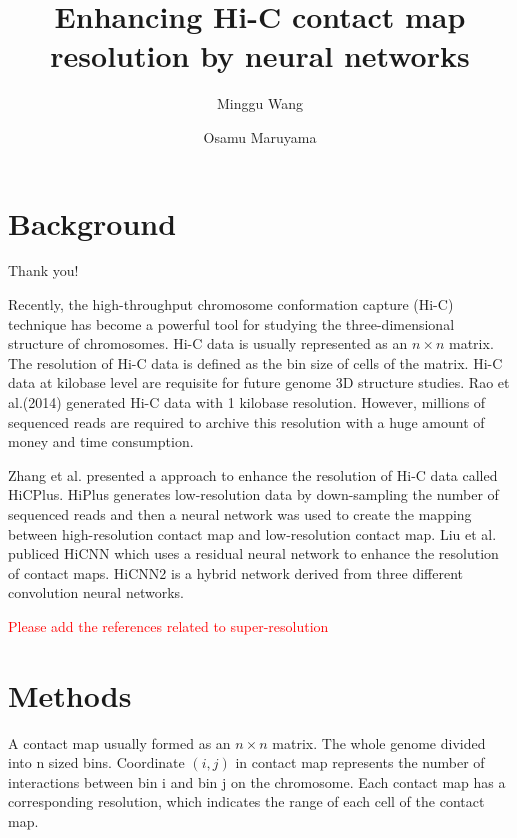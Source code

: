 \documentclass[a4paper,12pt]{article}
\begin{document}
\title{Enhancing Hi-C contact map resolution by neural networks}
\author{Minggu Wang \and Osamu Maruyama}
\maketitle

\section{Background}

Thank you!

Recently, the high-throughput chromosome conformation capture (Hi-C) technique has 
become a powerful tool for studying the three-dimensional structure of chromosomes. 
Hi-C data is usually represented as an $n \times n$ matrix. 
The resolution of Hi-C data is defined as the bin size of cells of the matrix. 
Hi-C data at kilobase level are requisite for future genome 3D structure studies. 
Rao et al.(2014) \cite{Rao2014} generated Hi-C data with 1 kilobase resolution. However, millions of sequenced reads are required to archive this resolution with a huge amount of money and time consumption.

Zhang et al. \cite{Zhang2018} presented a approach to enhance the resolution of Hi-C data called HiCPlus. 
HiPlus generates low-resolution data by down-sampling the number of sequenced reads and then a neural network was used to create the mapping between high-resolution contact map and low-resolution contact map. 
Liu et al. publiced HiCNN \cite{Liu2019} which uses a residual neural network to enhance the resolution of contact maps. 
HiCNN2 \cite{Liu2019a} is a hybrid network derived from three different convolution neural networks.  

\textcolor{red}{Please add the references related to super-resolution}



\section{Methods}
A contact map usually formed as  an $n \times n$ matrix. The whole genome divided into n sized bins. Coordinate $(i,j)$ in contact map represents the number of interactions between bin i and bin j on the chromosome. Each contact map has a corresponding resolution, which indicates the range of each cell of the contact map.
\end{document}
